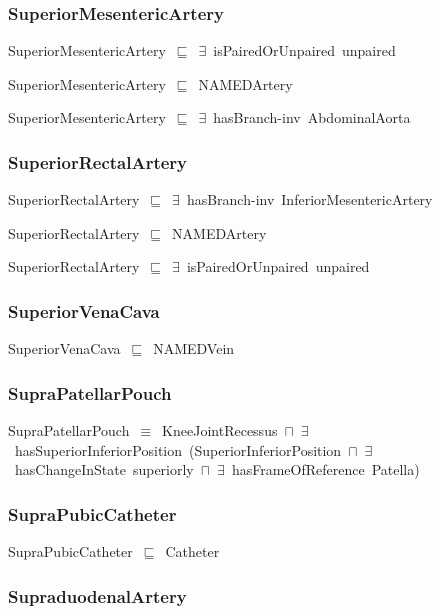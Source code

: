\documentclass{article}
\begin{document}
\subsubsection*{SuperiorMesentericArtery}

SuperiorMesentericArtery~\ensuremath{\sqsubseteq}~\ensuremath{\exists}~isPairedOrUnpaired~unpaired~

SuperiorMesentericArtery~\ensuremath{\sqsubseteq}~NAMEDArtery~

SuperiorMesentericArtery~\ensuremath{\sqsubseteq}~\ensuremath{\exists}~hasBranch-inv~AbdominalAorta~

\subsubsection*{SuperiorRectalArtery}

SuperiorRectalArtery~\ensuremath{\sqsubseteq}~\ensuremath{\exists}~hasBranch-inv~InferiorMesentericArtery~

SuperiorRectalArtery~\ensuremath{\sqsubseteq}~NAMEDArtery~

SuperiorRectalArtery~\ensuremath{\sqsubseteq}~\ensuremath{\exists}~isPairedOrUnpaired~unpaired~

\subsubsection*{SuperiorVenaCava}

SuperiorVenaCava~\ensuremath{\sqsubseteq}~NAMEDVein~

\subsubsection*{SupraPatellarPouch}

SupraPatellarPouch~\ensuremath{\equiv}~KneeJointRecessus~\ensuremath{\sqcap}~\ensuremath{\exists}~hasSuperiorInferiorPosition~(SuperiorInferiorPosition~\ensuremath{\sqcap}~\ensuremath{\exists}~hasChangeInState~superiorly~\ensuremath{\sqcap}~\ensuremath{\exists}~hasFrameOfReference~Patella)

\subsubsection*{SupraPubicCatheter}

SupraPubicCatheter~\ensuremath{\sqsubseteq}~Catheter~

\subsubsection*{SupraduodenalArtery}
\end{document}
